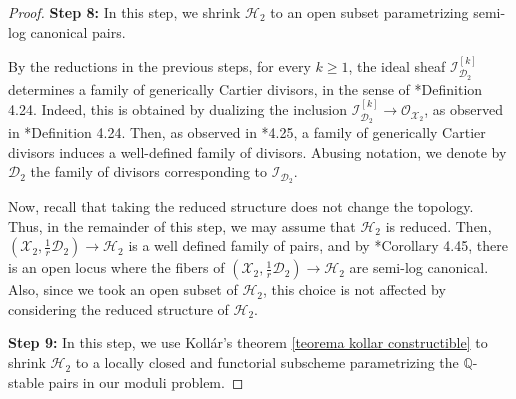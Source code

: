 \documentclass{amsart}
\newcommand{\bQ}{\mathbb{Q}}
\newcommand{\sD}{\mathscr{D}}
\newcommand{\sH}{\mathscr{H}}
\newcommand{\sI}{\mathscr{I}}
\newcommand{\sX}{\mathscr{X}}
\theoremstyle{definition}
\newcommand{\rar}{\rightarrow}
\def\O#1.{\mathcal {O}_{#1}}
\begin{document}
\begin{proof}

{\bf Step 8:} In this step, we shrink $\sH_2$ to an open subset parametrizing semi-log canonical pairs.


By the reductions in the previous steps, for every $k \geq 1$, the ideal sheaf $\sI_{\sD_2}^{[k]}$ determines a family of generically Cartier divisors, in the sense of \cite{kol_new}*{Definition 4.24}.
Indeed, this is obtained by dualizing the inclusion $\sI_{\sD_2}^{[k]} \rar \O \sX_2.$, as observed in \cite{kol_new}*{Definition 4.24}.
Then, as observed in \cite{kol_new}*{4.25}, a family of generically Cartier divisors induces a well-defined family of divisors.
Abusing notation, we denote by $\sD_2$ the family of divisors corresponding to $\sI_{\sD_2}$.

Now, recall that taking the reduced structure does not change the topology.
Thus, in the remainder of this step, we may assume that $\sH_2$ is reduced.
Then, $(\sX_2,\frac{1}{r}\sD_2) \rar \sH_2$ is a well defined family of pairs, and by \cite{kol_new}*{Corollary 4.45}, there is an open locus where the fibers of $(\sX_2,\frac{1}{r}\sD_2) \rar \sH_2$ are semi-log canonical.
Also, since we took an open subset of $\sH_2$, this choice is not affected by considering the reduced structure of $\sH_2$.

{\bf Step 9:} In this step, we use Koll\'ar's theorem \ref{teorema kollar constructible} to shrink $\sH_2$ to a locally closed and functorial subscheme parametrizing the $\bQ$-stable pairs in our moduli problem.


\end{proof}
\end{document}
